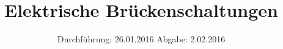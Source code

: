 

\subject{VERSUCH NUMMER 302}
\title{Elektrische Brückenschaltungen}
\date{
  Durchführung: 26.01.2016
  \hspace{3em}
  Abgabe:  2.02.2016
}



\maketitle
\thispagestyle{empty}
\tableofcontents
\newpage







\printbibliography


